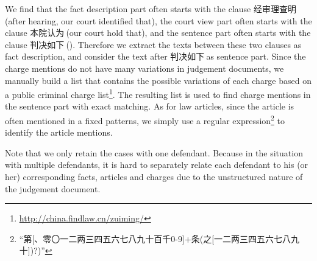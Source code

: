 We find that the fact description part often starts with the clause 经审理查明$\ $(after hearing, our court identified that), the court view part often starts with the clause 本院认为$\ $(our court hold that), and the sentence part often starts with the clause 判决如下$\ $(). Therefore we extract the texts between these two clauses as fact description, and consider the text after 判决如下$\ $as sentence part. Since the charge mentions do not have many variations in judgement documents, we manually build a list that contains the possible variations of each charge based on a public criminal charge list\footnote{\url{http://china.findlaw.cn/zuiming/}}. The resulting list is used to find charge mentions in the sentence part with exact matching. As for law articles, since the article is often mentioned in a fixed patterns, we simply use a regular expression\footnote{``第[、零〇一二两三四五六七八九十百千0-9]+条(之[一二两三四五六七八九十])?)''} to identify the article mentions. 

Note that we only retain the cases with one defendant. Because in the situation with multiple defendants, it is hard to separately relate each defendant to his (or her) corresponding facts, articles and charges due to the unstructured nature of the judgement document.